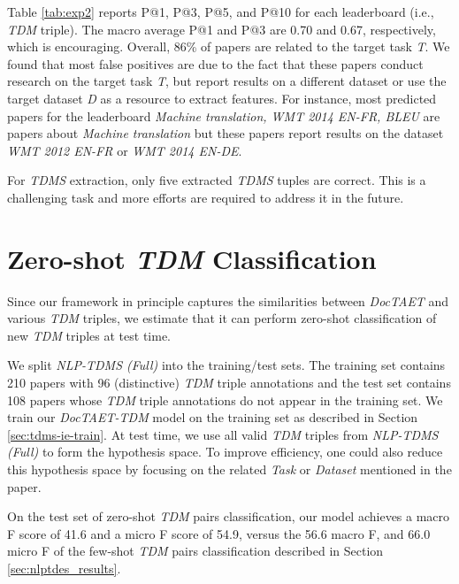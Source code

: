 \documentclass[11pt,a4paper]{article}
\begin{document}
Table \ref{tab:exp2} reports P@1, P@3, P@5, and P@10 for each leaderboard (i.e., \emph{TDM} triple). The  macro average P@1 and P@3 are 0.70 and 0.67, respectively, which is encouraging. Overall, 86\% of papers 
are related to the target task \emph{T}. We found that most false positives are due to the fact that these papers conduct research on the target task \emph{T}, but report results on a different dataset 
or use the target dataset \emph{D} as a resource to extract features. For instance, most predicted papers for the leaderboard \emph{Machine translation, WMT 2014 EN-FR, BLEU} are papers about \emph{Machine translation} but 
these papers report results on the dataset \emph{WMT 2012 EN-FR} or \emph{WMT 2014 EN-DE}. 

For \emph{TDMS} extraction, only five extracted \emph{TDMS} tuples are correct. This is a challenging task and more efforts are required to address it in the future. 









\section{Zero-shot \emph{TDM} Classification}\label{sec:zeroshot_results}
Since our framework in principle captures the similarities between \emph{DocTAET} and various \emph{TDM} triples, we estimate that it can perform zero-shot classification of new \emph{TDM} triples at test time. 

We split \emph{NLP-TDMS (Full)} into the training/test sets. The training set contains 210 papers with 96 (distinctive) \emph{TDM} triple annotations and the test set contains 108 papers whose \emph{TDM} triple annotations do not appear in the training set. We train our \emph{DocTAET-TDM} model on the training set as described in Section \ref{sec:tdms-ie-train}. At test time, we use all valid \emph{TDM} triples from \emph{NLP-TDMS (Full)} to form the hypothesis space. To improve efficiency, one could also reduce this hypothesis space by focusing on the related \emph{Task} or \emph{Dataset} mentioned in the paper. 

On the test set of zero-shot \emph{TDM} pairs classification, our model achieves a macro F score of 41.6 and a micro F score of 54.9, versus the 56.6 macro F, and 66.0 micro F of the few-shot \emph{TDM} pairs classification described in Section \ref{sec:nlptdes_results}. 
\end{document}

